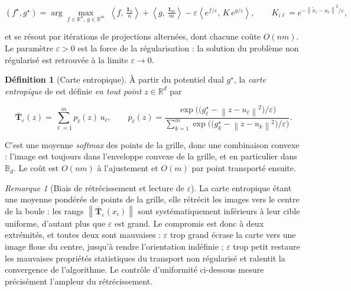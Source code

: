 \documentclass[11pt,a4paper]{article}
\theoremstyle{definition}
\newtheorem{definition}{Définition}[section]
\theoremstyle{remark}
\newtheorem{remarque}{Remarque}[section]
\newcommand{\R}{\mathbb{R}}
\newcommand{\Bball}{\mathbb{B}}
\newcommand{\norm}[1]{\left\lVert #1 \right\rVert}
\newcommand{\scal}[2]{\left\langle #1 ,\, #2 \right\rangle}
\newcommand{\Tmap}{\mathbf{T}}
\begin{document}
\medskip

\[
  (f^\star, g^\star)
  = \arg\max_{f \in \R^n,\, g \in \R^m}\;
  \scal{f}{\tfrac{\mathbf{1}_n}{n}} + \scal{g}{\tfrac{\mathbf{1}_m}{m}}
  - \varepsilon \scal{e^{f/\varepsilon}}{K\,e^{g/\varepsilon}},
  \qquad
  K_{i\ell} = e^{-\norm{\tilde{x}_i - u_\ell}^2/\varepsilon},
\]

\bigskip

et se résout par itérations de projections alternées, dont chacune coûte $O(nm)$. Le
paramètre $\varepsilon > 0$ est la force de la régularisation : la solution du problème non
régularisé est retrouvée à la limite $\varepsilon \to 0$.

\medskip

\begin{definition}[Carte entropique]
  \label{def:carte-entropique}
  À partir du potentiel dual $g^\star$, la \emph{carte entropique} de
  \citet{pooladian2021} est définie \emph{en tout point} $z \in \R^d$ par

  \medskip

  \[
    \bar{\Tmap}_\varepsilon(z) = \sum_{\ell=1}^{m} p_\ell(z)\, u_\ell,
    \qquad
    p_\ell(z) = \frac{\exp\!\big(\big(g^\star_\ell - \norm{z - u_\ell}^2\big)/\varepsilon\big)}
    {\sum_{k=1}^{m}\exp\!\big(\big(g^\star_k - \norm{z - u_k}^2\big)/\varepsilon\big)}.
  \]

  \bigskip

  C'est une moyenne \emph{softmax} des points de la grille, donc une combinaison convexe :
  l'image est toujours dans l'enveloppe convexe de la grille, et en particulier dans
  $\Bball_d$. Le coût est $O(nm)$ à l'ajustement et $O(m)$ par point transporté ensuite.
\end{definition}

\bigskip

\begin{remarque}[Biais de rétrécissement et lecture de $\varepsilon$]
  \label{rem:ot-shrinkage}
  La carte entropique étant une moyenne pondérée de points de la grille, elle rétrécit les
  images vers le centre de la boule : les rangs $\norm{\bar{\Tmap}_\varepsilon(x_i)}$ sont
  systématiquement inférieurs à leur cible uniforme, d'autant plus que $\varepsilon$ est
  grand. Le compromis est donc à deux extrémités, et toutes deux sont mauvaises :
  $\varepsilon$ trop grand écrase la carte vers une image floue du centre, jusqu'à rendre
  l'orientation indéfinie ; $\varepsilon$ trop petit restaure les mauvaises propriétés
  statistiques du transport non régularisé et ralentit la convergence de l'algorithme. Le
  contrôle d'uniformité ci-dessous mesure précisément l'ampleur du rétrécissement.
\end{remarque}
\end{document}

